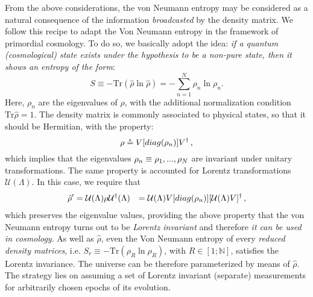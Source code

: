 \documentclass[nofootinbib,prd,superscriptaddress,showpacs,showkeys,]{revtex4}
\newcommand*{\bbN}{\ensuremath{\mathbb N}}
\begin{document}
From the above considerations, the von Neumann entropy may be considered as a natural consequence of the information \emph{broadcasted} by the density matrix. We follow this recipe to adapt the Von Neumann entropy in the framework of primordial cosmology. To do so, we basically adopt the idea: \emph{if a quantum (cosmological) state exists under the hypothesis to be a non-pure state, then it shows an entropy of the form}:
\begin{equation}
S \equiv -\text{Tr}{(\hat{\rho}\ln\hat{\rho})} = -\sum^N_{n=1} \rho_n\ln\rho_n.
\end{equation}
Here, $\rho_n$ are the eigenvalues of $\rho$, with the additional normalization condition $
\text{Tr}\hat{\rho} = 1$.
The density matrix is commonly associated to physical states, so that it should be Hermitian, with the property:
\begin{equation}\label{hermitiano}
\rho \circeq V[diag({\bf \rho}_n)]V^{\dagger}\,,
\end{equation}
which implies that the eigenvalues ${\bf \rho}_n\equiv\rho_1,..., \rho_{N}$ are invariant under unitary transformations.
The same property is accounted for Lorentz transformations $\mathcal U(\Lambda)$. In this case, we require that
\begin{eqnarray}\label{lorentz}
\hat{\rho}^\prime &= \mathcal U(\Lambda)\rho
\mathcal U^\dag(\Lambda) &= \mathcal U(\Lambda)V[diag({\bf \rho}_n)][{\mathcal U(\Lambda)V}]^{\dagger}\,,
\end{eqnarray}
which preserves the eigenvalue values, providing the above  property that the von Neumann entropy turns out to be \emph{Lorentz invariant} and therefore \emph{it can be used in  cosmology}. As well as $\hat\rho$, even the Von Neumann entropy of every \emph{reduced density matrices}, i.e. $S_r\equiv -\text{Tr}{(\rho_R\ln\rho_R)}$, with $R\in[1;{\bbN}]$,  satisfies the Lorentz invariance. The universe can be therefore  parameterized by means of $\hat\rho$. The strategy lies on assuming a set of Lorentz invariant (separate) measurements for arbitrarily chosen epochs of its evolution.
\end{document}
